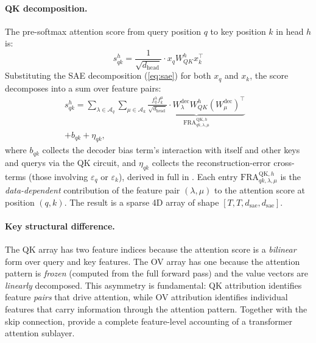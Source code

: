 \documentclass{article} %
\theoremstyle{plain}
\theoremstyle{definition}
\theoremstyle{remark}
\newcommand{\WQK}{W_{QK}}
\newcommand{\dhead}{d_{\mathrm{head}}}
\newcommand{\dsae}{d_{\mathrm{sae}}}
\begin{document}
\paragraph{QK decomposition.} The pre-softmax attention score from query position $q$ to key position $k$ in head $h$ is:
\begin{equation}
    s^h_{qk} = \frac{1}{\sqrt{\dhead}} \cdot x_q \WQK^h x_k^\top
    \label{eq:attn_score}
\end{equation}
Substituting the SAE decomposition (\eqref{eq:sae}) for both $x_q$ and $x_k$, the score decomposes into a sum over feature pairs:
\begin{equation}
\begin{aligned}
        s^h_{qk} = \sum_{\lambda \in \mathcal{A}_q} \sum_{\mu \in \mathcal{A}_k} \underbrace{\frac{f_q^\lambda f_k^\mu}{\sqrt{\dhead}} \cdot W^{\mathrm{dec}}_\lambda \WQK^h (W^{\mathrm{dec}}_\mu)^\top}_{\mathrm{FRA}^{\mathrm{QK},h}_{qk,\lambda,\mu}}&\\ + b_{qk} + \eta_{qk},
\end{aligned}
    \label{eq:qk_fra}
\end{equation}
where $b_{qk}$ collects the decoder bias term's interaction with itself and other keys and querys via the QK circuit, and $\eta_{qk}$ collects the reconstruction-error cross-terms (those involving $\varepsilon_q$ or $\varepsilon_k$), derived in full in . Each entry $\mathrm{FRA}^{\mathrm{QK},h}_{qk,\lambda,\mu}$ is the \emph{data-dependent} contribution of the feature pair $(\lambda, \mu)$ to the attention score at position $(q,k)$. The result is a sparse 4D array of shape $[T, T, \dsae, \dsae]$.

\paragraph{Key structural difference.} The QK array has two feature indices because the attention score is a \emph{bilinear} form over query and key features. The OV array has one because the attention pattern is \emph{frozen} (computed from the full forward pass) and the value vectors are \emph{linearly} decomposed. This asymmetry is fundamental: QK attribution identifies feature \emph{pairs} that drive attention, while OV attribution identifies individual features that carry information through the attention pattern. Together with the skip connection,  provide a complete feature-level accounting of a transformer attention sublayer.
\end{document}
